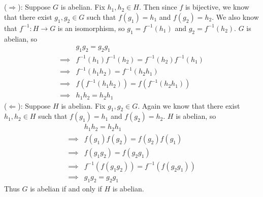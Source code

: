 \documentclass{article}
\begin{document}
\renewcommand{\thesubsection}{\thesection.\alph{subsection}}
\section{} %
($\Longrightarrow$): Suppose $G$ is abelian.
Fix $h_1,h_2\in H$. Then since $f$ is bijective, we know that there exist
$g_1,g_2\in G$ such that $f(g_1)=h_1$ and $f(g_2)=h_2$. We also know that
$f^{-1}:H\longrightarrow G$ is an isomorphism, so $g_1=f^{-1}(h_1)$ and
$g_2=f^{-1}(h_2)$. $G$ is abelian, so
\begin{align*}
	&g_1g_2=g_2g_1\\
	\implies&f^{-1}(h_1)f^{-1}(h_2)=f^{-1}(h_2)f^{-1}(h_1)\\
	\implies&f^{-1}(h_1h_2)=f^{-1}(h_2h_1)\\
	\implies&f(f^{-1}(h_1h_2))=f(f^{-1}(h_2h_1))\\
	\implies&h_1h_2=h_2h_1
\end{align*}
($\Longleftarrow$): Suppose $H$ is abelian.
Fix $g_1,g_2\in G$. Again we know that there exist $h_1,h_2\in H$ such that
$f(g_1)=h_1$ and $f(g_2)=h_2$. $H$ is abelian, so
\begin{align*}
	&h_1h_2=h_2h_1\\
	\implies&f(g_1)f(g_2)=f(g_2)f(g_1)\\
	\implies&f(g_1g_2)=f(g_2g_1)\\
	\implies&f^{-1}(f(g_1g_2))=f^{-1}(f(g_2g_1))\\
	\implies&g_1g_2=g_2g_1
\end{align*}
Thus $G$ is abelian if and only if $H$ is abelian.
\end{document}
